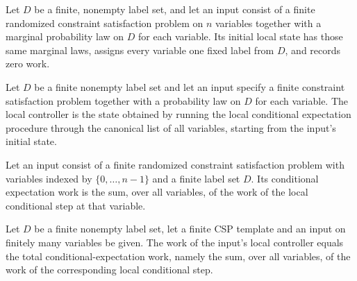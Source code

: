 \begin{definition}
\label{FABL.FiniteRandomizedCSPInput.initialLocalState}
\leanok
{}
Let $D$ be a finite, nonempty label set, and let an input consist of a finite randomized
constraint satisfaction problem on $n$ variables together with a marginal probability
law on $D$ for each variable. Its initial local state has those same marginal laws,
assigns every variable one fixed label from $D$, and records zero work.
\end{definition}

\begin{definition}
\label{FABL.FiniteRandomizedCSPInput.localController}
\leanok
{}
Let $D$ be a finite nonempty label set and let an input specify a finite constraint
satisfaction problem together with a probability law on $D$ for each variable. The local
controller is the state obtained by running the local conditional expectation procedure
through the canonical list of all variables, starting from the input's initial state.
\end{definition}

\begin{definition}
\label{FABL.FiniteRandomizedCSPInput.conditionalExpectationWork}
\leanok
{}
Let an input consist of a finite randomized constraint satisfaction problem with
variables indexed by $\{0,\ldots,n-1\}$ and a finite label set $D$. Its conditional
expectation work is the sum, over all variables, of the work of the local conditional
step at that variable.
\end{definition}

\begin{theorem}
\label{FABL.FiniteRandomizedCSPInput.localController_work_eq_conditionalExpectationWork}
\leanok
{}
Let $D$ be a finite nonempty label set, let a finite CSP template and an input on
finitely many variables be given. The work of the input’s local controller equals the
total conditional-expectation work, namely the sum, over all variables, of the work of
the corresponding local conditional step.
\end{theorem}

